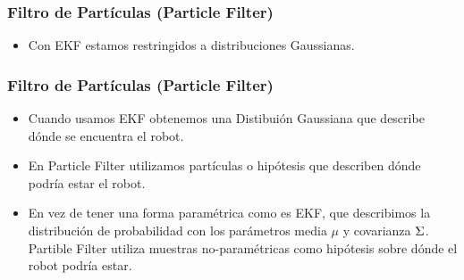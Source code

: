 \begin{frame}
    \frametitle{Filtro de Partículas (Particle Filter)}
    
    
    \begin{itemize}
        \item Con EKF estamos restringidos a distribuciones Gaussianas.
    \end{itemize}
    
\end{frame}


\begin{frame}
    \frametitle{Filtro de Partículas (Particle Filter)}
    
    
    \begin{itemize}
        \item Cuando usamos EKF obtenemos una Distibuión Gaussiana que describe dónde se encuentra el robot.
        \item En Particle Filter utilizamos partículas o hipótesis que describen dónde podría estar el robot.
        \item En vez de tener una forma paramétrica como es EKF, que describimos la distribución de probabilidad con los parámetros media $\mu$ y covarianza $\Sigma$. Partible Filter utiliza muestras no-paramétricas como hipótesis sobre dónde el robot podría estar.
    \end{itemize}
    
\end{frame}
